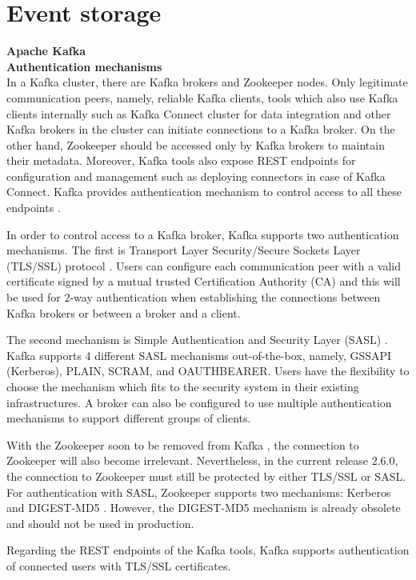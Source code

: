 \section{Event storage} \label{section:security}
\large \textbf{Apache Kafka}\\
\normalsize
\textbf{Authentication mechanisms}\\
In a Kafka cluster, there are Kafka brokers and Zookeeper nodes. Only legitimate communication peers, namely, reliable Kafka clients, tools which also use Kafka clients internally such as Kafka Connect cluster for data integration and other Kafka brokers in the cluster can initiate connections to a Kafka broker. On the other hand, Zookeeper should be accessed only by Kafka brokers to maintain their metadata. Moreover, Kafka tools also expose REST endpoints for configuration and management such as deploying connectors in case of Kafka Connect. Kafka provides authentication mechanism to control access to all these endpoints \cite{kafkasecurity}.

In order to control access to a Kafka broker, Kafka supports two authentication mechanisms. The first is Transport Layer  Security/Secure Sockets Layer (TLS/SSL) protocol \cite{tls}. Users can configure each communication peer with a valid certificate signed by a mutual trusted Certification Authority (CA) and this will be used for 2-way authentication when establishing the connections between Kafka brokers or between a broker and a client. 

The second mechanism is Simple Authentication and  Security Layer (SASL) \cite{sasl}. Kafka supports 4 different SASL mechanisms out-of-the-box, namely, GSSAPI (Kerberos), PLAIN, SCRAM, and OAUTHBEARER. Users have the flexibility to choose the mechanism which fits to the security system in their existing infrastructures. A broker can also be configured to use multiple authentication mechanisms to support different groups of clients. 

With the Zookeeper soon to be removed from Kafka \cite{kafkaremovezookeeper}, the connection to Zookeeper will also become irrelevant. Nevertheless, in the current release 2.6.0, the connection to Zookeeper must still be protected by either TLS/SSL or SASL. For authentication with SASL, Zookeeper supports two mechanisms: Kerberos and DIGEST-MD5 \cite{zookeepersecurity}. However, the DIGEST-MD5 mechanism is already obsolete and should not be used in production.

Regarding the REST endpoints of the Kafka tools, Kafka supports authentication of connected users with TLS/SSL certificates. 

